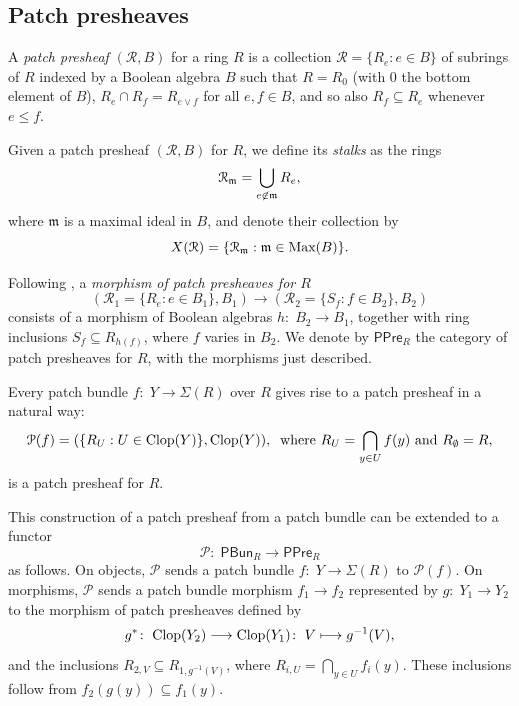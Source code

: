\documentclass[11pt]{amsart}
\def\m{{\mathfrak m}} %
\begin{document}
\subsection[Patch presheaves]{Patch presheaves}\label{subsect: patch presheaves and bundles}
A {\it patch presheaf} $({{\mathcal R}}, B)$ for a ring $R$ is a collection ${{\mathcal R}}=\{R_e:e \in B\}$ of subrings of $R$ indexed by a Boolean algebra $B$ such that $R=R_0$ (with $0$ the bottom element of $B$), $R_e \cap R_f = R_{e \vee f}$ for all $e,f \in B$, and so also $R_f \subseteq R_e$ whenever $e \leq f$.  

Given a patch presheaf $({{\mathcal R}}, B)$ for $R$, we define its {\it stalks} as the rings \[{{\mathcal R}}_{\m} = \bigcup_{e \not \in {\ff m}} R_e,\] where ${\mathfrak{m}}$ is a maximal ideal in $B$, and denote their collection by \[{X}({{\mathcal R}})=   \{{{\mathcal R}}_{\m}:\m \in \Max(B)\}.\]

Following \cite[Definition 3.10]{CosOlb}, a {\it morphism of patch presheaves for $R$} 
\[({\mathcal R_1}=\{R_e : e\in B_1\}, B_1)\to ({\mathcal R_2}=\{S_f: f\in B_2\}, B_2)\]
consists of a morphism of Boolean algebras $h\colon\; B_2\to B_1$, together with ring inclusions $S_f\subseteq R_{h(f)}$, where $f$ varies in $B_2$. We denote by $\mathsf{PPre}_R$ the category of patch presheaves for $R$, with the morphisms just described.
 
\medskip
Every patch bundle $f\colon\; Y \rightarrow \Sigma(R)$ over $R$ gives rise to a patch presheaf in a natural way: 
\[\mathcal P(f)=(\{R_U:U\in\mbox{\rm Clop}(Y)\},\mbox{\rm Clop}(Y)), \: {\mbox{ where }}
R_U=\bigcap_{y\in U}f(y) {\mbox{ and }} R_\emptyset =R,\]
 is a patch presheaf for $R$. 

This construction of a patch presheaf from a patch bundle can be extended to a functor
\begin{equation}\label{eq: functor P}
\mathcal P\colon\; \mathsf{PBun}_R\to \mathsf{PPre}_R 
\end{equation}
as follows.
On objects, $\mathcal P$ sends a patch bundle $f\colon\; Y\to\Sigma(R)$ to $\mathcal{P}(f)$. On morphisms, $\mathcal P$ sends a patch bundle morphism $f_1\to f_2$ represented by $g\colon\; Y_1\to Y_2$ to the morphism of patch presheaves defined by
\[
g^*\colon\; \mbox{\rm Clop}(Y_2)\longrightarrow\mbox{\rm Clop}(Y_1)\colon\; V\longmapsto g^{-1}(V),
\]
and the inclusions $R_{2,V}\subseteq R_{1,g^{-1}(V)}$, where $R_{i,U}=\bigcap_{y\in U}f_i(y)$. These inclusions follow from $f_2(g(y))\subseteq f_1(y)$.
\end{document}
